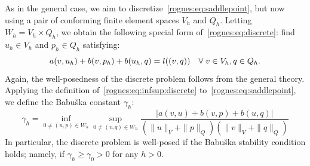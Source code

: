 As in the general case, we aim to
discretize~\eqref{rognes:eq:saddlepoint}, but now using a pair of
conforming finite element spaces $V_h$ and $Q_h$. Letting $W_h = V_h
\times Q_h$, we obtain the following special form
of~\eqref{rognes:eq:discrete}: find $u_h \in V_h$ and $p_h \in Q_h$
satisfying:
\begin{equation}
    \label{rognes:eq:saddlepoint:discrete}
    a(v, u_h) + b(v, p_h) + b(u_h, q) = l((v, q))
    \quad \forall \; v \in V_h, q \in Q_h.
\end{equation}
Again, the well-posedness of the discrete problem follows from the
general theory. Applying the definition of~\eqref{rognes:eq:infsup:discrete}
to~\eqref{rognes:eq:saddlepoint}, we define the Babu\v ska constant
$\gamma_h$:
\begin{equation}
  \label{rognes:eq:Babuska}
  \gamma_h = \inf_{0 \not = (u, p) \in W_h} \sup_{0 \not = (v, q) \in W_h}
  \frac{|a(v, u) + b(v, p) + b(u, q)|} {(\|u\|_{V} + \|p\|_{Q})
    (\|v\|_{V} + \|q\|_{Q})}
\end{equation}
In particular, the discrete problem is well-posed if the Babu\v ska
stability condition holds; namely, if $\gamma_h \geq \gamma_0 > 0$ for
any $h > 0$.



